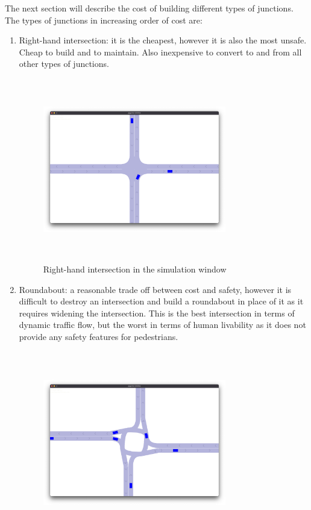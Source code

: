 \documentclass[
]{elteikthesis}[2023/04/10]
\begin{document}
The next section will describe the cost of building different types
of junctions. The types of junctions in increasing order of cost are: 
\begin{enumerate}
\item Right-hand intersection: it is the cheapest, however it is also the
most unsafe. Cheap to build and to maintain. Also inexpensive to convert
to and from all other types of junctions. 
\begin{figure}[H]
\begin{centering}
\includegraphics[width=8cm,height=8cm,keepaspectratio]{images/junction_righthand}
\par\end{centering}
\caption{Right-hand intersection in the simulation window}
\end{figure}
\item Roundabout: a reasonable trade off between cost and safety, however
it is difficult to destroy an intersection and build a roundabout
in place of it as it requires widening the intersection. This is the
best intersection in terms of dynamic traffic flow, but the worst
in terms of human livability as it does not provide any safety features
for pedestrians. 
\begin{figure}[H]
\begin{centering}
\includegraphics[width=8cm,height=8cm,keepaspectratio]{images/junction_roundabout}

\end{centering}
\end{figure}
\end{enumerate}
\end{document}
